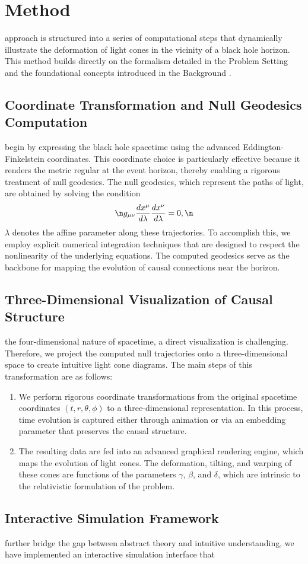\documentclass{article}
\begin{document}
\section{Method}\n\nOur approach is structured into a series of computational steps that dynamically illustrate the deformation of light cones in the vicinity of a black hole horizon. This method builds directly on the formalism detailed in the Problem Setting and the foundational concepts introduced in the Background \cite{Reference1,Reference2,Reference3,Reference4}.\n\n\subsection{Coordinate Transformation and Null Geodesics Computation}\n\nWe begin by expressing the black hole spacetime using the advanced Eddington-Finkelstein coordinates. This coordinate choice is particularly effective because it renders the metric regular at the event horizon, thereby enabling a rigorous treatment of null geodesics. The null geodesics, which represent the paths of light, are obtained by solving the condition\n\begin{equation}\n  g_{\mu\nu}\frac{dx^\mu}{d\lambda}\frac{dx^\nu}{d\lambda} = 0, \n\end{equation}\nwhere $\lambda$ denotes the affine parameter along these trajectories. To accomplish this, we employ explicit numerical integration techniques that are designed to respect the nonlinearity of the underlying equations. The computed geodesics serve as the backbone for mapping the evolution of causal connections near the horizon.\n\n\subsection{Three-Dimensional Visualization of Causal Structure}\n\nGiven the four-dimensional nature of spacetime, a direct visualization is challenging. Therefore, we project the computed null trajectories onto a three-dimensional space to create intuitive light cone diagrams. The main steps of this transformation are as follows:\n\begin{enumerate}\n  \item We perform rigorous coordinate transformations from the original spacetime coordinates $(t,r,\theta,\phi)$ to a three-dimensional representation. In this process, time evolution is captured either through animation or via an embedding parameter that preserves the causal structure.\n  \item The resulting data are fed into an advanced graphical rendering engine, which maps the evolution of light cones. The deformation, tilting, and warping of these cones are functions of the parameters $\gamma$, $\beta$, and $\delta$, which are intrinsic to the relativistic formulation of the problem.\n\end{enumerate}\n\n\subsection{Interactive Simulation Framework}\n\nTo further bridge the gap between abstract theory and intuitive understanding, we have implemented an interactive simulation interface that 
\end{document}
